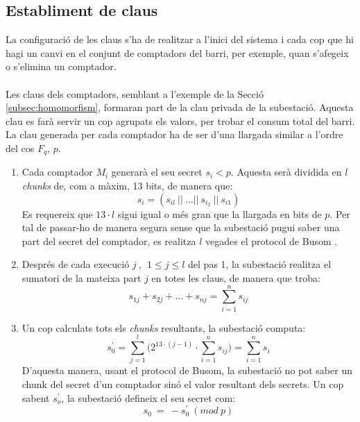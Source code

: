 \documentclass{article}
\begin{document}
\subsection{Establiment de claus}\label{section:ks}
La configuració de les claus s'ha de realitzar a l'inici del sistema i cada cop que hi hagi un canvi en el conjunt de comptadors del barri, per exemple, quan s'afegeix o s'elimina un comptador.
\\
\\
Les claus dels comptadors, semblant a l'exemple de la Secció \ref{subsec:homomorfism}, formaran part de la clau privada de la subestació. Aquesta clau es farà servir un cop agrupats els valors, per trobar el consum total del barri.
La clau generada per cada comptador ha de ser d'una llargada similar a l'ordre del cos $F_q$, $p$.
\begin{enumerate}
	\item Cada comptador $M_i$ generarà el seu secret $s_i < p$. Aquesta serà dividida en $l$ \textit{chunks} de, com a màxim, 13 bits, de manera que:
	\[s_i = (s_{il}\ ||\ \dots ||\ s_{i_2}\ ||\ s_{i1})\]
	Es requereix que $13 \cdot l$ sigui igual o més gran que la llargada en bits de $p$. Per tal de passar-ho de manera segura sense que la subestació pugui saber una part del secret del comptador, es realitza  $l$ vegades el protocol de Busom \cite{busom}.
	\item Després de cada execució $j \ , \ \ 1 \le j \le l$ del pas 1, la subestació realitza el sumatori de la mateixa part $j$ en totes les claus, de manera que troba:
	\[s_{1j} + s_{2j} + \dots + s_{nj} = \sum_{i=1}^{n} s_{ij}\]
	\item Un cop calculats tots els \textit{chunks} resultants, la subestació computa:
	\[s_0^{'} = \sum_{j=1}^{l} \Big( 2^{13 \cdot (j - 1)} \cdot \sum_{i=1}^{n} s_{ij} \Big) = \sum_{i=1}^{n} s_i\]
	D'aquesta manera, usant el protocol de Busom, la subestació no pot saber un chunk del secret d'un comptador sinó el valor resultant dels secrets. Un cop sabent $s_o^{'}$, la subestació defineix el seu secret com:
	\[s_0\ =\ - s_0^{'} \ (mod \ p)\]
\end{enumerate}
\end{document}
